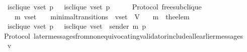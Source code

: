 \begin{isabellebody}
\ \ {\isasymlongrightarrow}\ is{\isacharunderscore}clique\ {\isacharparenleft}v{\isacharunderscore}set{\isacharcomma}\ p{\isacharcomma}\ {\isasymsigma}{\isacharparenright}\ {\isacharequal}\ is{\isacharunderscore}clique\ {\isacharparenleft}v{\isacharunderscore}set{\isacharcomma}\ p{\isacharcomma}\ {\isasymsigma}{\isacharprime}{\isacharparenright}{\isachardoublequoteclose}\isanewline
%
\isadelimproof
\ \ %
\endisadelimproof
%
\isatagproof
{}\isamarkupfalse%
%
\endisatagproof
{\isafoldproof}%
%
\isadelimproof
\isanewline
%
\endisadelimproof
\isanewline
\isanewline
\isanewline
\isanewline
\isanewline
\isanewline
{}\isamarkupfalse%
\ {\isacharparenleft}\ Protocol{\isacharparenright}\ free{\isacharunderscore}sub{\isacharunderscore}clique\ {\isacharcolon}\isanewline
\ \ {\isachardoublequoteopen}{\isasymforall}\ {\isasymsigma}\ {\isasymsigma}{\isacharprime}\ m{\isacharprime}\ v{\isacharunderscore}set{\isachardot}\ {\isacharparenleft}{\isasymsigma}{\isacharcomma}\ {\isasymsigma}{\isacharprime}{\isacharparenright}\ {\isasymin}\ minimal{\isacharunderscore}transitions\ {\isasymand}\ v{\isacharunderscore}set\ {\isasymsubseteq}\ V\isanewline
\ \ {\isasymlongrightarrow}\ m{\isacharprime}\ {\isacharequal}\ the{\isacharunderscore}elem\ {\isacharparenleft}{\isasymsigma}{\isacharprime}\ {\isacharminus}\ {\isasymsigma}{\isacharparenright}\isanewline
\ \ {\isasymlongrightarrow}\ is{\isacharunderscore}clique\ {\isacharparenleft}v{\isacharunderscore}set{\isacharcomma}\ p{\isacharcomma}\ {\isasymsigma}{\isacharparenright}\ {\isacharequal}\ is{\isacharunderscore}clique\ {\isacharparenleft}v{\isacharunderscore}set\ {\isacharminus}\ {\isacharbraceleft}sender\ m{\isacharprime}{\isacharbraceright}{\isacharcomma}\ p{\isacharcomma}\ {\isasymsigma}{\isacharprime}{\isacharparenright}{\isachardoublequoteclose}\isanewline
%
\isadelimproof
\ \ %
\endisadelimproof
%
\isatagproof
{}\isamarkupfalse%
%
\endisatagproof
{\isafoldproof}%
%
\isadelimproof
\isanewline
%
\endisadelimproof
\isanewline
\isanewline
\isanewline
\isanewline
{}\isamarkupfalse%
\ {\isacharparenleft}\ Protocol{\isacharparenright}\ later{\isacharunderscore}messages{\isacharunderscore}from{\isacharunderscore}non{\isacharunderscore}equivocating{\isacharunderscore}validator{\isacharunderscore}include{\isacharunderscore}all{\isacharunderscore}earlier{\isacharunderscore}messages\ {\isacharcolon}\isanewline
\ \ {\isachardoublequoteopen}{\isasymforall}\ v\ {\isasymsigma}\ {\isasymsigma}{}\ {\isasymsigma}{}{\isachardot}\ {\isasymsigma}\ {\isasymin}\ {\isasymSigma}\ {\isasymand}\ {\isasymsigma}{}\ {\isasymin}\ {\isasymSigma}\ {\isasymand}\ {\isasymsigma}{}\ {\isasymsubseteq}\ {\isasymsigma}\ {\isasymand}\ {\isasymsigma}{}\ {\isasymsubseteq}\ {\isasymsigma}\ {\isasymand}\ {\isasymsigma}{}\ {\isasyminter}\ {\isasymsigma}{}\ {\isacharequal}\ {\isasymemptyset}\isanewline

\end{isabellebody}
